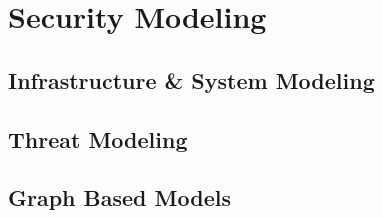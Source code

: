

\section{Security Modeling}\label{sec:background:modeling}



\subsection{Infrastructure \& System Modeling}



\label{sec:background:infra_modeling}

\subsection{Threat Modeling}

\label{sec:background:attack_modeling}


\subsection{Graph Based Models}\label{sec:background:attack_graphs}

